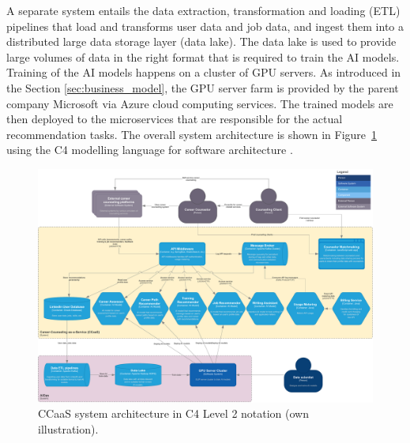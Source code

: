 A separate system entails the data extraction, transformation and loading (ETL) pipelines that load 
and transforms user data and job data, and ingest them into a distributed large data storage layer
(data lake). The data lake is used to provide large volumes of data in the right format that is 
required to train the AI models. Training of the AI models happens on a cluster of GPU servers. As
introduced in the Section \ref{sec:business_model}, the GPU server farm is provided by the parent
company Microsoft via Azure cloud computing services. The trained models are then deployed to the
microservices that are responsible for the actual recommendation tasks. The overall system architecture
is shown in Figure~\ref{fig:system_architecture} using the C4 modelling language for software architecture
\citep{brownC4ModelVisualising2010}.

\begin{landscape}
    \begin{figure}
        \centering
        \caption{CCaaS system architecture in C4 Level 2 notation (own illustration).}
        \label{fig:system_architecture}
        \includegraphics[width=\textwidth]{figures/c4_system_architecture.pdf}
    \end{figure}        
\end{landscape}


